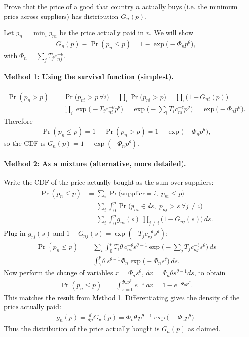 Prove that the price of a good that country $n$ actually buys (i.e. the minimum price across suppliers) has distribution $G_n(p)$.

\begin{solution}
Let $p_n=\min_i p_{ni}$ be the price actually paid in $n$. We will show
\begin{align*}
G_n(p)\equiv \Pr(p_n \le p) = 1 - \exp\!\big(-\Phi_n p^{\theta}\big),
\end{align*}
with $\Phi_n=\sum_j T_j c_{nj}^{-\theta}$.

\paragraph{Method 1: Using the survival function (simplest).}
\begin{align*}
\Pr(p_n > p)
&= \Pr\big(p_{ni} > p\ \forall i\big)
= \prod_i \Pr\big(p_{ni} > p\big)
= \prod_i \big(1 - G_{ni}(p)\big) \\
&= \prod_i \exp\!\big(-T_i c_{ni}^{-\theta} p^{\theta}\big)
= \exp\!\Big(-\sum_i T_i c_{ni}^{-\theta} p^{\theta}\Big)
= \exp\!\big(-\Phi_n p^{\theta}\big).
\end{align*}
Therefore
\begin{align*}
\Pr(p_n \le p) = 1 - \Pr(p_n>p) = 1 - \exp\!\big(-\Phi_n p^{\theta}\big),
\end{align*}
so the CDF is $G_n(p)=1-\exp(-\Phi_n p^\theta)$.

\paragraph{Method 2: As a mixture (alternative, more detailed).}
Write the CDF of the price actually bought as the sum over suppliers:
\begin{align*}
\Pr(p_n \le p)
&= \sum_i \Pr\big(\text{supplier}=i,\; p_{ni}\le p\big) \\
&= \sum_i \int_0^p \Pr\big(p_{ni}\in ds,\; p_{nj}>s\ \forall j\neq i\big) \\
&= \sum_i \int_0^p g_{ni}(s)\, \prod_{j\neq i}\big(1-G_{nj}(s)\big)\, ds.
\end{align*}
Plug in $g_{ni}(s)$ and $1-G_{nj}(s)=\exp(-T_j c_{nj}^{-\theta} s^{\theta})$:
\begin{align*}
\Pr(p_n \le p)
&= \sum_i \int_0^p T_i\theta\, c_{ni}^{-\theta} s^{\theta-1}
    \exp\!\Big(-\sum_j T_j c_{nj}^{-\theta} s^{\theta}\Big)\, ds \\
&= \int_0^p \theta\, s^{\theta-1} \Phi_n \exp\!\big(-\Phi_n s^{\theta}\big)\, ds.
\end{align*}
Now perform the change of variables $x=\Phi_n s^{\theta}$, $dx=\Phi_n\theta s^{\theta-1} ds$, to obtain
\begin{align*}
\Pr(p_n \le p)
&= \int_{x=0}^{\Phi_n p^{\theta}} e^{-x}\, dx
= 1 - e^{-\Phi_n p^{\theta}}.
\end{align*}
This matches the result from Method 1. Differentiating gives the density of the price actually paid:
\begin{align*}
g_n(p) = \frac{d}{dp}G_n(p) = \Phi_n \theta\, p^{\theta-1} \exp\!\big(-\Phi_n p^{\theta}\big).
\end{align*}
Thus the distribution of the price actually bought is $G_n(p)$ as claimed.
\end{solution}
